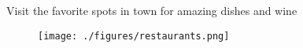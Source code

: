 
\vspace{0.3cm}
\large{Visit the favorite spots in town for amazing dishes and wine}
\begin{figure}
  \begin{center}
    \leavevmode
    \texttt{[image: ./figures/restaurants.png]}
  \end{center}
\end{figure}
